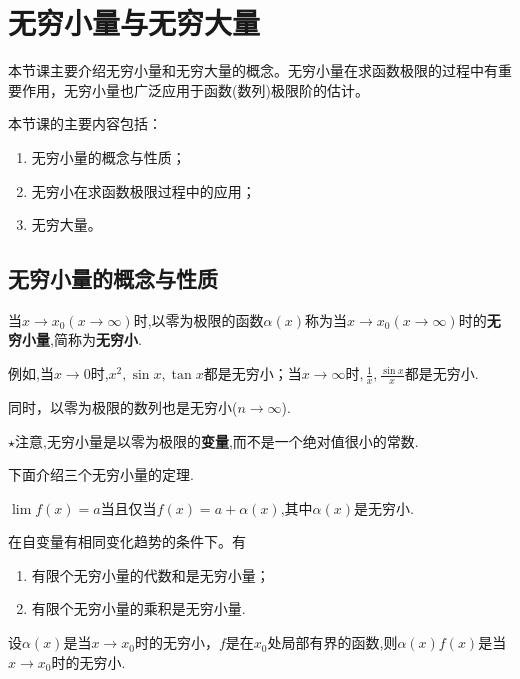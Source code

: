 \chapter{无穷小量与无穷大量}

本节课主要介绍无穷小量和无穷大量的概念。无穷小量在求函数极限的过程中有重要作用，无穷小量也广泛应用于函数(数列)极限阶的估计。
	
	本节课的主要内容包括：
	\begin{enumerate}
		\item 无穷小量的概念与性质；
		\item 无穷小在求函数极限过程中的应用；
		\item 无穷大量。
	\end{enumerate}

	\section{无穷小量的概念与性质}
	
	\begin{definition}
		当$x\to x_0\left(x\to \infty\right)$时,以零为极限的函数$\alpha(x)$称为当$x\to x_0\left(x\to \infty\right)$时的\textbf{无穷小量},简称为\textbf{无穷小}.
	\end{definition}

	例如,当$x\to 0$时,$x^2,\sin x,\tan x$都是无穷小；当$x\to \infty \text{时},\frac{1}{x},\frac{\sin x}{x}$都是无穷小.
	
	同时，以零为极限的数列也是无穷小($n\to \infty$).
	
	$\star$注意,无穷小量是以零为极限的\textbf{变量},而不是一个绝对值很小的常数.
	
	下面介绍三个无穷小量的定理.
	\begin{theorem}
		$\lim\limits_{}f(x)=a \text{当且仅当}f(x)=a+\alpha(x)$,其中$\alpha(x)$是无穷小.
	\end{theorem}

	\begin{theorem}
		在自变量有相同变化趋势的条件下。有
		\begin{enumerate}
			\item 有限个无穷小量的代数和是无穷小量；
			\item 有限个无穷小量的乘积是无穷小量.
		\end{enumerate}
	\end{theorem}

	\begin{theorem}
		\label{the3}
		设$\alpha(x)$是当$x\to x_0$时的无穷小，$f$是在$x_0$处局部有界的函数,则$\alpha (x)f(x)$是当$x\to x_0$时的无穷小.
	\end{theorem}
	
